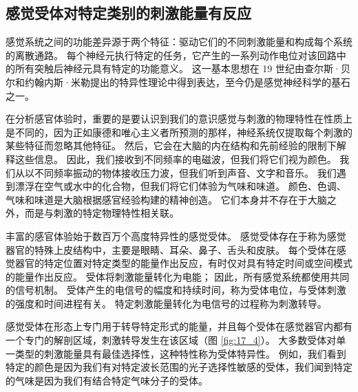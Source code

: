 \subsection{感觉受体对特定类别的刺激能量有反应}

感觉系统之间的功能差异源于两个特征：驱动它们的不同刺激能量和构成每个系统的离散通路。 
每个神经元执行特定的任务，它产生的一系列动作电位对该回路中的所有突触后神经元具有特定的功能意义。 
这一基本思想在 19 世纪由查尔斯·贝尔和约翰内斯·米勒提出的特异性理论中得到表达，至今仍是感觉神经科学的基石之一。


在分析感官体验时，重要的是要认识到我们的意识感觉与刺激的物理特性在性质上是不同的，因为正如康德和唯心主义者所预测的那样，神经系统仅提取每个刺激的某些特征而忽略其他特征。 
然后，它会在大脑的内在结构和先前经验的限制下解释这些信息。 
因此，我们接收到不同频率的电磁波，但我们将它们视为颜色。 
我们从以不同频率振动的物体接收压力波，但我们听到声音、文字和音乐。 
我们遇到漂浮在空气或水中的化合物，但我们将它们体验为气味和味道。 
颜色、色调、气味和味道是大脑根据感官经验构建的精神创造。 
它们本身并不存在于大脑之外，而是与刺激的特定物理特性相关联。


丰富的感官体验始于数百万个高度特异性的感觉受体。 
感觉受体存在于称为感觉器官的特殊上皮结构中，主要是眼睛、耳朵、鼻子、舌头和皮肤。 
每个受体在感觉器官的特定位置对特定类型的能量作出反应，有时仅对具有特定时间或空间模式的能量作出反应。 
受体将刺激能量转化为电能； 
因此，所有感觉系统都使用共同的信号机制。 
受体产生的电信号的幅度和持续时间，称为受体电位，与受体刺激的强度和时间进程有关。
特定刺激能量转化为电信号的过程称为刺激转导。


感觉受体在形态上专门用于转导特定形式的能量，并且每个受体在感觉器官内都有一个专门的解剖区域，刺激转导发生在该区域（图 \ref{fig:17_4}）。 
大多数受体对单一类型的刺激能量具有最佳选择性，这种特性称为受体特异性。
例如，我们看到特定的颜色是因为我们有对特定波长范围的光子选择性敏感的受体，我们闻到特定的气味是因为我们有结合特定气味分子的受体。


